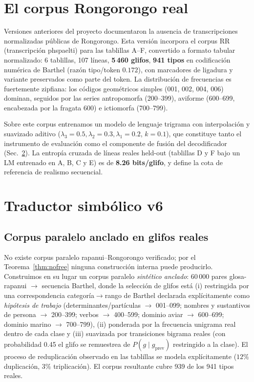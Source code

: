 \documentclass[10pt,twocolumn]{article}
\begin{document}
\section{El corpus Rongorongo real}
\label{sec:corpus-real}

Versiones anteriores del proyecto documentaron la ausencia de
transcripciones normalizadas públicas de Rongorongo. Esta versión
incorpora el corpus RR (transcripción phspaelti) para las tablillas
A--F, convertido a formato tabular normalizado:
6 tablillas, 107 líneas, \textbf{5\,460 glifos}, \textbf{941 tipos} en
codificación numérica de Barthel (razón tipo/token $0.172$), con
marcadores de ligadura y variante preservados como parte del token. La
distribución de frecuencias es fuertemente zipfiana: los códigos
geométricos simples (001, 002, 004, 006) dominan, seguidos por las
series antropomorfa (200--399), aviforme (600--699, encabezada por la
fragata 600) e ictiomorfa (700--799).

Sobre este corpus entrenamos un modelo de lenguaje trigrama con
interpolación y suavizado aditivo
($\lambda_3{=}0.5,\lambda_2{=}0.3,\lambda_1{=}0.2$, $k{=}0.1$), que
constituye tanto el instrumento de evaluación como el componente de
fusión del decodificador (Sec.~\ref{sec:v6}). La entropía cruzada de
líneas reales held-out (tablillas D y F bajo un LM entrenado en A, B, C y
E) es de \textbf{8.26 bits/glifo}, y define la cota de referencia de
realismo secuencial.

\section{Traductor simbólico v6}
\label{sec:v6}

\subsection{Corpus paralelo anclado en glifos reales}

No existe corpus paralelo rapanui--Rongorongo verificado; por el
Teorema~\ref{thm:nofree} ninguna construcción interna puede producirlo.
Construimos en su lugar un corpus paralelo \emph{sintético anclado}:
60\,000 pares glosa-rapanui $\to$ secuencia Barthel, donde la selección
de glifos está (i) restringida por una correspondencia
categoría$\to$rango de Barthel declarada explícitamente como
\emph{hipótesis de trabajo} (determinantes/partículas $\to$ 001--099;
nombres y sustantivos de persona $\to$ 200--399; verbos $\to$ 400--599;
dominio aviar $\to$ 600--699; dominio marino $\to$ 700--799), (ii)
ponderada por la frecuencia unigrama real dentro de cada clase y (iii)
suavizada por transiciones bigrama reales (con probabilidad 0.45 el
glifo se remuestrea de $P(g\mid g_{\mathrm{prev}})$ restringido a la
clase). El proceso de reduplicación observado en las tablillas se modela
explícitamente ($12\%$ duplicación, $3\%$ triplicación). El corpus
resultante cubre 939 de los 941 tipos reales.
\end{document}
